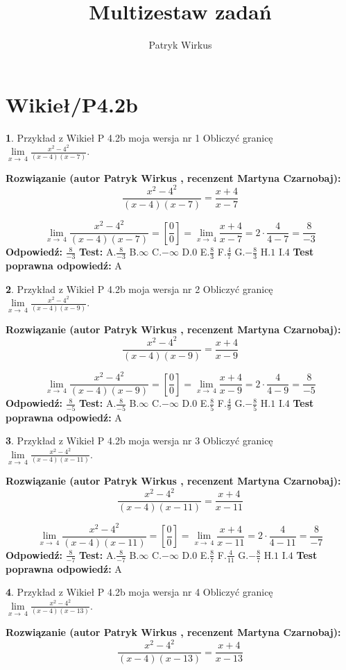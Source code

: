 \documentclass[12pt, a4paper]{article}
\title{Multizestaw zadań}
\author{Patryk Wirkus}
\date{}
\theoremstyle{definition} %
\newtheorem{zad}{}
\newcommand{\kategoria}[1]{\section{#1}}
\newcommand{\zadStart}[1]{\begin{zad}#1\newline}
\newcommand{\zadStop}{\end{zad}}
\newcommand{\rozwStart}[2]{\noindent \textbf{Rozwiązanie (autor #1 , recenzent #2): }\newline}
\newcommand{\rozwStop}{\newline}
\newcommand{\odpStart}{\noindent \textbf{Odpowiedź:}\newline}
\newcommand{\odpStop}{\newline}
\newcommand{\testStart}{\noindent \textbf{Test:}\newline}
\newcommand{\testStop}{\newline}
\newcommand{\kluczStart}{\noindent \textbf{Test poprawna odpowiedź:}\newline}
\newcommand{\kluczStop}{\newline}
\begin{document}
\maketitle

\kategoria{Wikieł/P4.2b}


\zadStart{Przykład z Wikieł P 4.2b moja wersja nr 1}
Obliczyć granicę $\lim\limits_{x\to\ 4}\frac{x^{2}-4^{2}}{(x-4)(x-7)}$.
\zadStop
\rozwStart{Patryk Wirkus}{Martyna Czarnobaj}
$$\frac{x^{2}-4^{2}}{(x-4)(x-7)}=\frac{x+4}{x-7}$$

$$\lim\limits_{x\to\ 4}\frac{x^{2}-4^{2}}{(x-4)(x-7)}=[\frac{0}{0}]=\lim\limits_{x\to\ 4}\frac{x+4}{x-7}=2 \cdot \frac{4}{4-7} = \frac{8}{-3}$$
\rozwStop
\odpStart
$\frac{8}{-3}$
\odpStop
\testStart
A.$\frac{8}{-3}$
B.$\infty$
C.$-\infty$
D.$0$
E.$\frac{8}{3}$
F.$\frac{4}{7}$
G.$-\frac{8}{3}$
H.$1$
I.$4$
\testStop
\kluczStart
A
\kluczStop



\zadStart{Przykład z Wikieł P 4.2b moja wersja nr 2}
Obliczyć granicę $\lim\limits_{x\to\ 4}\frac{x^{2}-4^{2}}{(x-4)(x-9)}$.
\zadStop
\rozwStart{Patryk Wirkus}{Martyna Czarnobaj}
$$\frac{x^{2}-4^{2}}{(x-4)(x-9)}=\frac{x+4}{x-9}$$

$$\lim\limits_{x\to\ 4}\frac{x^{2}-4^{2}}{(x-4)(x-9)}=[\frac{0}{0}]=\lim\limits_{x\to\ 4}\frac{x+4}{x-9}=2 \cdot \frac{4}{4-9} = \frac{8}{-5}$$
\rozwStop
\odpStart
$\frac{8}{-5}$
\odpStop
\testStart
A.$\frac{8}{-5}$
B.$\infty$
C.$-\infty$
D.$0$
E.$\frac{8}{5}$
F.$\frac{4}{9}$
G.$-\frac{8}{5}$
H.$1$
I.$4$
\testStop
\kluczStart
A
\kluczStop



\zadStart{Przykład z Wikieł P 4.2b moja wersja nr 3}
Obliczyć granicę $\lim\limits_{x\to\ 4}\frac{x^{2}-4^{2}}{(x-4)(x-11)}$.
\zadStop
\rozwStart{Patryk Wirkus}{Martyna Czarnobaj}
$$\frac{x^{2}-4^{2}}{(x-4)(x-11)}=\frac{x+4}{x-11}$$

$$\lim\limits_{x\to\ 4}\frac{x^{2}-4^{2}}{(x-4)(x-11)}=[\frac{0}{0}]=\lim\limits_{x\to\ 4}\frac{x+4}{x-11}=2 \cdot \frac{4}{4-11} = \frac{8}{-7}$$
\rozwStop
\odpStart
$\frac{8}{-7}$
\odpStop
\testStart
A.$\frac{8}{-7}$
B.$\infty$
C.$-\infty$
D.$0$
E.$\frac{8}{7}$
F.$\frac{4}{11}$
G.$-\frac{8}{7}$
H.$1$
I.$4$
\testStop
\kluczStart
A
\kluczStop



\zadStart{Przykład z Wikieł P 4.2b moja wersja nr 4}
Obliczyć granicę $\lim\limits_{x\to\ 4}\frac{x^{2}-4^{2}}{(x-4)(x-13)}$.
\zadStop
\rozwStart{Patryk Wirkus}{Martyna Czarnobaj}
$$\frac{x^{2}-4^{2}}{(x-4)(x-13)}=\frac{x+4}{x-13}$$
\end{document}
